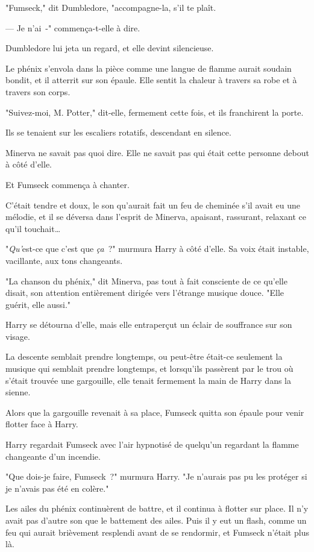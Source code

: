 "Fumseck," dit Dumbledore, "accompagne-la, s'il te plaît.

--- Je n'ai~-" commença-t-elle à dire.

Dumbledore lui jeta un regard, et elle devint silencieuse.

Le phénix s'envola dans la pièce comme une langue de flamme aurait soudain bondit, et il atterrit sur son épaule. Elle sentit la chaleur à travers sa robe et à travers son corps.

"Suivez-moi, M. Potter," dit-elle, fermement cette fois, et ils franchirent la porte.

\later

Ils se tenaient sur les escaliers rotatifs, descendant en silence.

Minerva ne savait pas quoi dire. Elle ne savait pas qui était cette personne debout à côté d'elle.

Et Fumseck commença à chanter.

C'était tendre et doux, le son qu'aurait fait un feu de cheminée s'il avait eu une mélodie, et il se déversa dans l'esprit de Minerva, apaisant, rassurant, relaxant ce qu'il touchait…

"\emph{Qu'}est-ce que c'est que \emph{ça}~?" murmura Harry à côté d'elle. Sa voix était instable, vacillante, aux tons changeants.

"La chanson du phénix," dit Minerva, pas tout à fait consciente de ce qu'elle disait, son attention entièrement dirigée vers l'étrange musique douce. "Elle guérit, elle aussi."

Harry se détourna d'elle, mais elle entraperçut un éclair de souffrance sur son visage.

La descente semblait prendre longtemps, ou peut-être était-ce seulement la musique qui semblait prendre longtemps, et lorsqu'ils passèrent par le trou où s'était trouvée une gargouille, elle tenait fermement la main de Harry dans la sienne.

Alors que la gargouille revenait à sa place, Fumseck quitta son épaule pour venir flotter face à Harry.

Harry regardait Fumseck avec l'air hypnotisé de quelqu'un regardant la flamme changeante d'un incendie.

"Que dois-je faire, Fumseck~?" murmura Harry. "Je n'aurais pas pu les protéger si je n'avais pas été en colère."

Les ailes du phénix continuèrent de battre, et il continua à flotter sur place. Il n'y avait pas d'autre son que le battement des ailes. Puis il y eut un flash, comme un feu qui aurait brièvement resplendi avant de se rendormir, et Fumseck n'était plus là.

